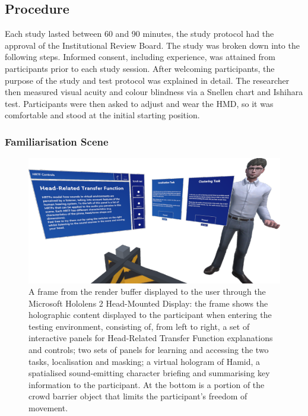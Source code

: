 \subsection{Procedure}\label{sec:psy-procedure}
Each study lasted between 60 and 90 minutes, the study protocol had the approval of the Institutional Review Board. The study was broken down into the following steps. Informed consent, including experience, was attained from participants prior to each study session. After welcoming participants, the purpose of the study and test protocol was explained in detail. The researcher then measured visual acuity and colour blindness via a Snellen chart and Ishihara test. Participants were then asked to adjust and wear the HMD, so it was comfortable and stood at the initial starting position. 

\subsubsection{Familiarisation Scene}
\begin{figure}[htbp]
    \centering
    \includegraphics[width=1\linewidth]{7_evaluation/images/test_participant_perspective.png}
    \caption{A frame from the render buffer displayed to the user through the Microsoft Hololens 2 Head-Mounted Display: the frame shows the holographic content displayed to the participant when entering the testing environment, consisting of, from left to right, a set of interactive panels for Head-Related Transfer Function explanations and controls; two sets of panels for learning and accessing the two tasks, localisation and masking; a virtual hologram of Hamid, a spatialised sound-emitting character briefing and summarising key information to the participant. At the bottom is a portion of the crowd barrier object that limits the participant's freedom of movement.}
    \label{fig:test-participant-perspective}
\end{figure}
